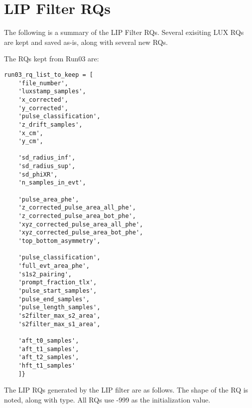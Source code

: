 
\chapter{LIP Filter RQs}

\label{app:lipfilter}

The following is a summary of the \ac{LIP} Filter \ac{RQ}s. Several  exisiting \ac{LUX} \ac{RQ}s are kept and saved as-is, along with several new \ac{RQ}s. 

The \ac{RQ}s kept from Run03 are:

\begin{verbatim}
run03_rq_list_to_keep = [
    'file_number',
    'luxstamp_samples',
    'x_corrected',
    'y_corrected',
    'pulse_classification',
    'z_drift_samples', 
    'x_cm',
    'y_cm',

    'sd_radius_inf',
    'sd_radius_sup',
    'sd_phiXR',
    'n_samples_in_evt',

    'pulse_area_phe',
    'z_corrected_pulse_area_all_phe',
    'z_corrected_pulse_area_bot_phe',
    'xyz_corrected_pulse_area_all_phe',
    'xyz_corrected_pulse_area_bot_phe',
    'top_bottom_asymmetry',

    'pulse_classification',
    'full_evt_area_phe',
    's1s2_pairing',
    'prompt_fraction_tlx',
    'pulse_start_samples',
    'pulse_end_samples',
    'pulse_length_samples',
    's2filter_max_s2_area',
    's2filter_max_s1_area',

    'aft_t0_samples',
    'aft_t1_samples',
    'aft_t2_samples',
    'hft_t1_samples'
    ]}
\end{verbatim}
The \ac{LIP} \ac{RQ}s generated by the \ac{LIP} filter are as follows. The shape of the \ac{RQ} is noted, along with type. All \ac{RQ}s use -999 as the initialization value. 


